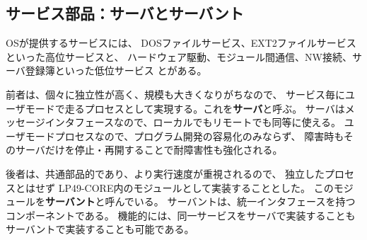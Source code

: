 \documentclass[draft]{ipsjpapers}
\begin{document}
\begin{comment}
  例えば, インターネットサービスは以下の様にディレクトリを形成している。
  ここに /tcp/0, /tcp/1,,, は個々のコネクションを表す。

{\footnotesize
\begin{verbatim}
        --+-- tcp/ -----+-- clone                               
          |             |-- stats                       
          |             |-- 0/ ---+-- ctl                
          |             |         |-- data          
          |             |         |-- local         
          |             |         :
          |             |
          |             |-- 1/ ---+-- ctl                
          |             |         |-- data          
          |             :         |-- local         
          |                       :
          |                
          |-- udp/ -----+-- clone                             
          |             |-- stats                       
          |             |-- 0/ ---+-- ctl                
          |             |         |-- data          
          |                       |-- local         
          |                       |                
          |--- arp/ ----
          :
\end{verbatim}
}
\end{comment} 



\subsection{サービス部品：サーバとサーバント}

  OSが提供するサービスには、
  DOSファイルサービス、EXT2ファイルサービスといった高位サービスと、
  ハードウェア駆動、モジュール間通信、NW接続、サーバ登録簿といった低位サービス
  とがある。

  前者は、個々に独立性が高く、規模も大きくなりがちなので、
  サービス毎にユーザモードで走るプロセスとして実現する。これを{\bf サーバ}と呼ぶ。
  サーバはメッセージインタフェースなので、ローカルでもリモートでも同等に使える。
  ユーザモードプロセスなので、プログラム開発の容易化のみならず、
  障害時もそのサーバだけを停止・再開することで耐障害性も強化される。

  後者は、共通部品的であり、より実行速度が重視されるので、
  独立したプロセスとはせず LP49-CORE内のモジュールとして実装することとした。
  このモジュールを{\bf サーバント}と呼んでいる。
  サーバントは、統一インタフェースを持つコンポーネントである。
  機能的には、同一サービスをサーバで実装することもサーバントで実装することも可能である。
\end{document}
